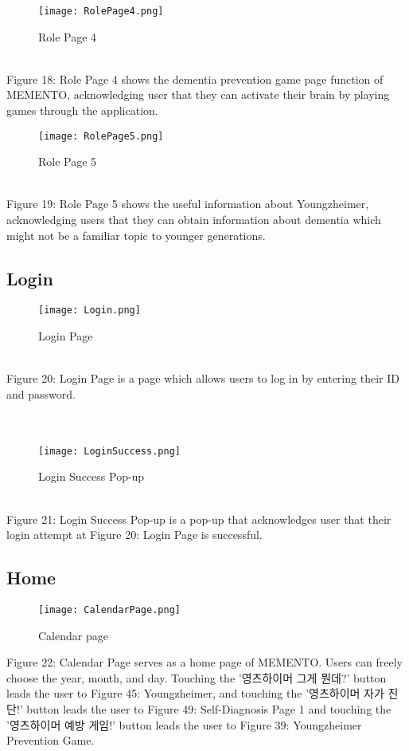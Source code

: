 \documentclass[conference]{IEEEtran}
\begin{document}
\begin{figure}[h]
\centerline{\texttt{[image: RolePage4.png]}}
\caption{Role Page 4}
\label{fig}
\end{figure}
\\Figure 18: Role Page 4 shows the dementia prevention game page function of MEMENTO, acknowledging user that they can activate their brain by playing games through the application.

\clearpage
\begin{figure}[h]
\centerline{\texttt{[image: RolePage5.png]}}
\caption{Role Page 5}
\label{fig}
\end{figure}
\\
Figure 19: Role Page 5 shows the useful information about Youngzheimer, acknowledging users that they can obtain information about dementia which might not be a familiar topic to younger generations.
\\
\subsection{Login}
\begin{figure}[h]
\centerline{\texttt{[image: Login.png]}}
\caption{Login Page}
\label{fig}
\end{figure}
\\
Figure 20: Login Page is a page which allows users to log in by entering their ID and password.
\\\\\\
\begin{figure}[h]
\centerline{\texttt{[image: LoginSuccess.png]}}
\caption{Login Success Pop-up}
\label{fig}
\end{figure}
\\
\indent Figure 21: Login Success Pop-up is a pop-up that acknowledges user that their login attempt at Figure 20: Login Page is successful.
\\
\subsection{Home}
\begin{figure}[h]
\centerline{\texttt{[image: CalendarPage.png]}}
\caption{Calendar page}
\label{fig}
\end{figure}
Figure 22: Calendar Page serves as a home page of MEMENTO. Users can freely choose the year, month, and day. Touching the '영츠하이머 그게 뭔데?' button leads the user to Figure 45: Youngzheimer, and touching the '영츠하이머 자가 진단!' button leads the user to Figure 49: Self-Diagnosis Page 1 and touching the '영츠하이머 예방 게임!' button leads the user to Figure 39: Youngzheimer Prevention Game. 
\end{document}

